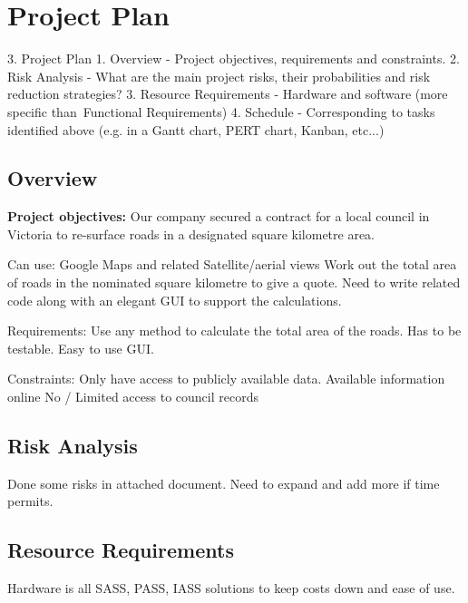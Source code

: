 \documentclass[a4paper,11pt]{article}
\begin{document}
\section{Project Plan}


3. Project Plan
  1. Overview - Project objectives, requirements and constraints.
  2. Risk Analysis - What are the main project risks, their probabilities and risk reduction strategies?
  3. Resource Requirements - Hardware and software (more specific than Functional Requirements)
  4. Schedule - Corresponding to tasks identified above (e.g. in a Gantt chart, PERT chart, Kanban, etc...)


\subsection{Overview}


\textbf{Project objectives:} Our company secured a contract for a local council in Victoria to re-surface roads in a designated square kilometre area.

Can use:
Google Maps and related
Satellite/aerial views
Work out the total area of roads in the nominated square kilometre to give a quote.
Need to write related code along with an elegant GUI to support the calculations.

Requirements:
Use any method to calculate the total area of the roads.
Has to be testable.
Easy to use GUI.

Constraints:
Only have access to publicly available data.
Available information online
No / Limited access to council records

\subsection{Risk Analysis}


Done some risks in attached document. Need to expand and add more if time permits.

\subsection{Resource Requirements}


Hardware is all SASS, PASS, IASS solutions to keep costs down and ease of use.
\end{document}
